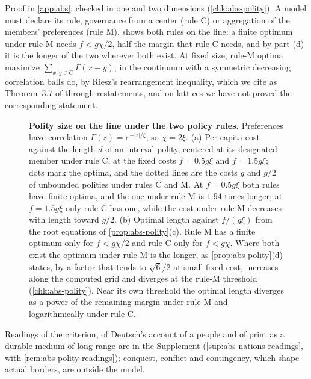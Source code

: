 
Proof in \cref{app:abs}; checked in one and two dimensions (\cref{chk:abs-polity}). A model must declare its rule, governance from a center (rule C) or aggregation of the members' preferences (rule M).  shows both rules on the line: a finite optimum under rule M needs $f<g\chi/2$, half the margin that rule C needs, and by part (d) it is the longer of the two wherever both exist. At fixed size, rule-M optima maximize $\sum_{x,y\in C}\Gamma(x-y)$; in the continuum with a symmetric decreasing correlation balls do, by Riesz's rearrangement inequality, which we cite as Theorem~3.7 of \citet{lieb2001analysis} through restatements, and on lattices we have not proved the corresponding statement.

\begin{figure}[t]
  \centering
  
  \caption{\textbf{Polity size on the line under the two policy rules.} Preferences have correlation $\Gamma(z)=e^{-\lvert z\rvert/\xi}$, so $\chi=2\xi$. (a) Per-capita cost against the length $d$ of an interval polity, centered at its designated member under rule C, at the fixed costs $f=0.5g\xi$ and $f=1.5g\xi$; dots mark the optima, and the dotted lines are the costs $g$ and $g/2$ of unbounded polities under rules C and M. At $f=0.5g\xi$ both rules have finite optima, and the one under rule M is $1.94$ times longer; at $f=1.5g\xi$ only rule C has one, while the cost under rule M decreases with length toward $g/2$. (b) Optimal length against $f/(g\xi)$ from the root equations of \cref{prop:abs-polity}(c). Rule M has a finite optimum only for $f<g\chi/2$ and rule C only for $f<g\chi$. Where both exist the optimum under rule M is the longer, as \cref{prop:abs-polity}(d) states, by a factor that tends to $\sqrt6/2$ at small fixed cost, increases along the computed grid and diverges at the rule-M threshold (\cref{chk:abs-polity}). Near its own threshold the optimal length diverges as a power of the remaining margin under rule M and logarithmically under rule C.}
  \label{fig:abs-polity}
\end{figure}

Readings of the criterion, of Deutsch's account of a people and of print as a durable medium of long range are in the Supplement (\cref{sup:abs-nations-readings}, with \cref{rem:abs-polity-readings}); conquest, conflict and contingency, which shape actual borders, are outside the model.

